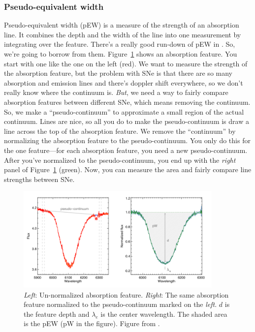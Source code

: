 \subsubsection{Pseudo-equivalent width}
Pseudo-equivalent width (pEW) is a measure of the strength of an absorption line. It combines the depth and the width of the line into one measurement by integrating over the feature. There's a really good run-down of pEW in \cite{Galbany2015}. So, we're going to borrow from them. Figure~\ref{fig:pew} shows an absorption feature. You start with one like the one on the left (red). We want to measure the strength of the absorption feature, but the problem with SNe is that there are so many absorption and emission lines and there's doppler shift everywhere, so we don't really know where the continuum is. \textit{But}, we need a way to fairly compare absorption features between different SNe, which means removing the continuum. So, we make a ``pseudo-continuum'' to approximate a small region of the actual continuum. Lines are nice, so all you do to make the pseudo-continuum is draw a line across the top of the absorption feature. We remove the ``continuum'' by normalizing the absorption feature to the pseudo-continuum. You only do this for the one feature---for each absorption feature, you need a new pseudo-continuum. After you've normalized to the pseudo-continuum, you end up with the \textit{right} panel of Figure~\ref{fig:pew} (green). Now, you can measure the area and fairly compare line strengths between SNe. 

\begin{figure}[h!]
    \centering
    \includegraphics[width=0.9\textwidth]{figs/Screenshot from 2022-07-12 16-05-37.png}
    \caption{\textit{Left}: Un-normalized absorption feature. \textit{Right}: The same absorption feature normalized to the pseudo-continuum marked on the \textit{left}. $d$ is the feature depth and $\lambda_{e}$ is the center wavelength. The shaded area is the pEW (pW in the figure). Figure from \cite{Galbany2015}.}
    \label{fig:pew}
\end{figure}

